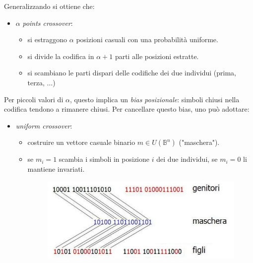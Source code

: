 \documentclass{article}
\begin{document}
Generalizzando si ottiene che:
\begin{itemize}
    \item $\alpha$\textit{ points crossover}:
    \begin{itemize}
        \item si estraggono $\alpha$ posizioni casuali con una probabilità uniforme.
        \item si divide la codifica in $\alpha +1$ parti alle posizioni estratte.
        \item si scambiano le parti dispari delle codifiche dei due individui (prima, terza, $\dots$)
    \end{itemize}
\end{itemize}
Per piccoli valori di $\alpha$, questo implica un \textit{bias posizionale}: simboli
chiusi nella codifica tendono a rimanere chiusi. Per cancellare questo bias, uno
può adottare:
\begin{itemize}
    \item \textit{uniform crossover}:
    \begin{itemize}
        \item costruire un vettore casuale binario $m\in U(\mathbb{B}^n)$ ("maschera").
        \item se $m_i=1$ scambia i simboli in posizione $i$ dei due individui,
        se $m_i=0$ li mantiene invariati.
        \begin{figure}[H]
            \centering
            \includegraphics[scale=0.5]{images/uniform_crossover.png}
        \end{figure}
    \end{itemize}
\end{itemize}
\end{document}
